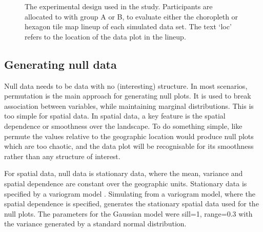 \documentclass[
doublespace,
  times]{anzsauth}
\begin{document}
\begin{figure}


\caption{\label{fig-exp-design}The experimental design used in the
study. Participants are allocated to with group A or B, to evaluate
either the choropleth or hexagon tile map lineup of each simulated data
set. The text `loc' refers to the location of the data plot in the
lineup.}

\end{figure}%

\subsection{Generating null data}\label{generating-null-data}

Null data needs to be data with no (interesting) structure. In most
scenarios, permutation is the main approach for generating null plots.
It is used to break association between variables, while maintaining
marginal distributions. This is too simple for spatial data. In spatial
data, a key feature is the spatial dependence or smoothness over the
landscape. To do something simple, like permute the values relative to
the geographic location would produce null plots which are too chaotic,
and the data plot will be recognisable for its smoothness rather than
any structure of interest.

For spatial data, null data is stationary data, where the mean, variance
and spatial dependence are constant over the geographic units.
Stationary data is specified by a variogram model \citep{POG}.
Simulating from a variogram model, where the spatial dependence is
specified, generates the stationary spatial data used for the null
plots. The parameters for the Gaussian model were sill=1, range=0.3 with
the variance generated by a standard normal distribution.
\end{document}
